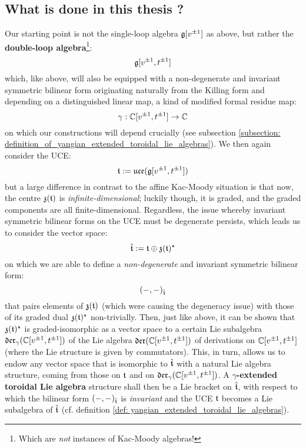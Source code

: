     \subsection{What is done in this thesis ?}
        Our starting point is not the single-loop algebra $\mathfrak{g}[v^{\pm 1}]$ as above, but rather the \textbf{double-loop algebra}\footnote{Which are \textit{not} instances of Kac-Moody algebras!}:
            $$\mathfrak{g}[v^{\pm 1}, t^{\pm 1}]$$
        which, like above, will also be equipped with a non-degenerate and invariant symmetric bilinear form originating naturally from the Killing form and depending on a distinguished linear map, a kind of modified formal residue map:
            $$\gamma: \mathbb{C}[v^{\pm 1}, t^{\pm 1}] \to \mathbb{C}$$
        on which our constructions will depend crucially (see subsection \ref{subsection: definition_of_yangian_extended_toroidal_lie_algebras}). We then again consider the UCE:
            $$\mathfrak{t} := \mathfrak{uce}(\mathfrak{g}[v^{\pm 1}, t^{\pm 1}])$$
        but a large difference in contrast to the affine Kac-Moody situation is that now, the centre $\mathfrak{z}(\mathfrak{t})$ is \textit{infinite-dimensional}; luckily though, it is graded, and the graded components are all finite-dimensional. Regardless, the issue whereby invariant symmetric bilinear forms on the UCE must be degenerate persists, which leads us to consider the vector space:
            $$\hat{\mathfrak{t}} := \mathfrak{t} \oplus \mathfrak{z}(\mathfrak{t})^{\star}$$
        on which we are able to define a \textit{non-degenerate} and invariant symmetric bilinear form:
            $$(-, -)_{\hat{\mathfrak{t}}}$$
        that pairs elements of $\mathfrak{z}(\mathfrak{t})$ (which were causing the degeneracy issue) with those of its graded dual $\mathfrak{z}(\mathfrak{t})^{\star}$ non-trivially. Then, just like above, it can be shown that $\mathfrak{z}(\mathfrak{t})^{\star}$ is graded-isomorphic as a vector space to a certain Lie subalgebra $\mathfrak{der}_{\gamma}(\mathbb{C}[v^{\pm 1}, t^{\pm 1}])$ of the Lie algebra $\mathfrak{der}(\mathbb{C}[v^{\pm 1}, t^{\pm 1}])$ of derivations on $\mathbb{C}[v^{\pm 1}, t^{\pm 1}]$ (where the Lie structure is given by commutators). This, in turn, allows us to endow any vector space that is isomorphic to $\hat{\mathfrak{t}}$ with a natural Lie algebra structure, coming from those on $\mathfrak{t}$ and on $\mathfrak{der}_{\gamma}(\mathbb{C}[v^{\pm 1}, t^{\pm 1}])$. A \textbf{$\gamma$-extended toroidal Lie algebra} structure shall then be a Lie bracket on $\hat{\mathfrak{t}}$, with respect to which the bilinear form $(-, -)_{\hat{\mathfrak{t}}}$ is \textit{invariant} and the UCE $\mathfrak{t}$ becomes a Lie subalgebra of $\hat{\mathfrak{t}}$ (cf. definition \ref{def: yangian_extended_toroidal_lie_algebras}).
        
